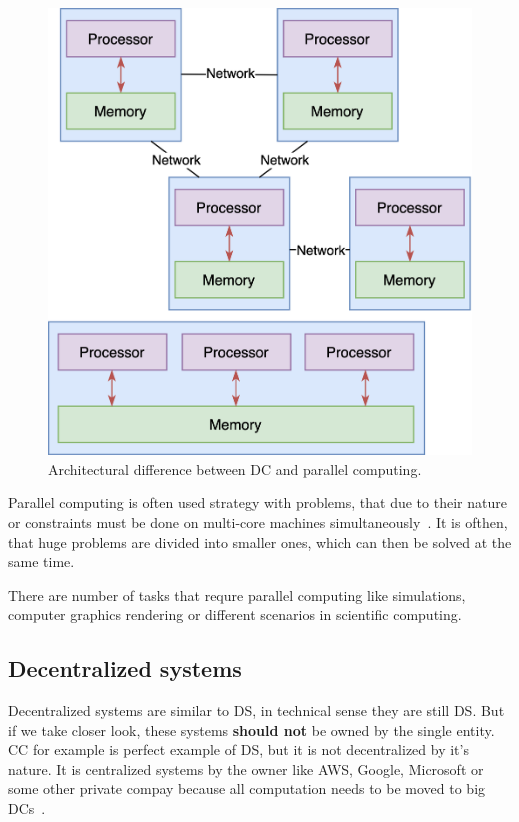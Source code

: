 \begin{figure}[H]
	\begin{center}
		\includegraphics[scale=0.9]{images/Figure4.png}
	\end{center}
	\vspace{-0.6cm}
	\caption{Architectural difference between DC and parallel computing.}
	\label{fig:fig4}
\end{figure}

Parallel computing is often used strategy with problems, that due to their nature or constraints must be done on multi-core machines simultaneously~\cite{0072397}. It is ofthen, that huge problems are divided into smaller ones, which can then be solved at the same time. 

There are number of tasks that requre parallel computing like simulations, computer graphics rendering or different scenarios in scientific computing.
%
%
\subsection{Decentralized systems}\label{sec:decentralized_systems}
%
Decentralized systems are similar to DS, in technical sense they are still DS. But if we take closer look, these systems \textbf{should not} be owned by the single entity. CC for example is perfect example of DS, but it is not decentralized by it's nature. It is centralized systems by the owner like AWS, Google, Microsoft or some other private compay because all computation needs to be moved to big DCs~\cite{HossainRH18}.

